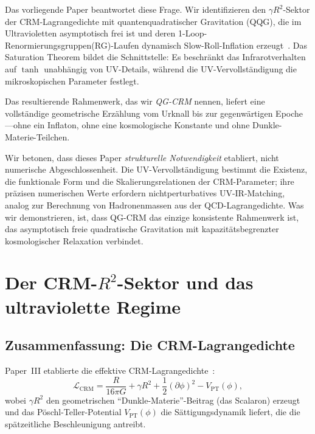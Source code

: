 \documentclass[aps,prd,twocolumn,superscriptaddress,nofootinbib]{revtex4-2}
\begin{document}
Das vorliegende Paper beantwortet diese Frage. Wir identifizieren den $\gamma R^2$-Sektor der CRM-Lagrangedichte mit quantenquadratischer Gravitation (QQG), die im Ultravioletten asymptotisch frei ist und deren 1-Loop-Renormierungsgruppen(RG)-Laufen dynamisch Slow-Roll-Inflation erzeugt~\cite{LiuQuintinAfshordi2026}. Das Saturation Theorem bildet die Schnittstelle: Es beschränkt das Infrarotverhalten auf $\tanh$ unabhängig von UV-Details, während die UV-Vervollständigung die mikroskopischen Parameter festlegt.

Das resultierende Rahmenwerk, das wir \textit{QG-CRM} nennen, liefert eine vollständige geometrische Erzählung vom Urknall bis zur gegenwärtigen Epoche---ohne ein Inflaton, ohne eine kosmologische Konstante und ohne Dunkle-Materie-Teilchen.

Wir betonen, dass dieses Paper \textit{strukturelle Notwendigkeit} etabliert, nicht numerische Abgeschlossenheit. Die UV-Vervollständigung bestimmt die Existenz, die funktionale Form und die Skalierungsrelationen der CRM-Parameter; ihre präzisen numerischen Werte erfordern nichtperturbatives UV-IR-Matching, analog zur Berechnung von Hadronenmassen aus der QCD-Lagrangedichte. Was wir demonstrieren, ist, dass QG-CRM das einzige konsistente Rahmenwerk ist, das asymptotisch freie quadratische Gravitation mit kapazitätsbegrenzter kosmologischer Relaxation verbindet.


\section{Der CRM-$R^2$-Sektor und das ultraviolette Regime}
\label{sec:r2sector}

\subsection{Zusammenfassung: Die CRM-Lagrangedichte}

Paper~III etablierte die effektive CRM-Lagrangedichte~\cite{Geiger2026c}:
\begin{equation}
\mathcal{L}_\mathrm{CRM} = \frac{R}{16\pi G} + \gamma R^2 + \frac{1}{2}(\partial\phi)^2 - V_\mathrm{PT}(\phi),
\label{eq:crm-lagrangian}
\end{equation}
wobei $\gamma R^2$ den geometrischen ``Dunkle-Materie''-Beitrag (das Scalaron) erzeugt und das Pöschl-Teller-Potential $V_\mathrm{PT}(\phi)$ die Sättigungsdynamik liefert, die die spätzeitliche Beschleunigung antreibt.
\end{document}
